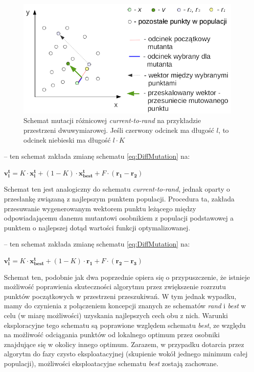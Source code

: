 \documentclass[12pt,a4paper]{report}
\begin{document}
{{{{\begin{description}
\begin{figure}[h]
\begin{center}\includegraphics[scale=0.8]{img/current-to-rand-mutation.png}\end{center}
\caption{Schemat mutacji różnicowej \emph{current-to-rand} na przykładzie przestrzeni dwuwymiarowej. Jeśli czerwony odcinek ma długość $l$, to odcinek niebieski ma długość $l \cdot K$}
\label{current-to-rand-img}
\end{figure}


\item[current-to-best] \cite{PracticalInsights} -- ten schemat zakłada zmianę schematu \ref{eq:DiffMutation} na:
\begin{center}
 $\mathbf{v_i^{t}} = K \cdot \mathbf{x_i^t} + (1 - K) \cdot \mathbf{x_{best}^t} + F \cdot (\mathbf{r_{1}} - \mathbf{r_{2}})$
\end{center}
Schemat ten jest analogiczny do schematu \emph{current-to-rand}, jednak oparty o przesłankę związaną z najlepszym punktem populacji. Procedura ta, zakłada przesuwanie wygenerowanym wektorem punktu leżącego między odpowiadającemu danemu mutantowi osobnikiem z populacji podstawowej a punktem o najlepszej dotąd wartości funkcji optymalizowanej.


\item[rand-to-best] \cite{PracticalInsights} -- ten schemat zakłada zmianę schematu \ref{eq:DiffMutation} na:
\begin{center}
 $\mathbf{v_i^{t}} = K \cdot \mathbf{x_{best}^t} + (1 - K) \cdot \mathbf{r_1} + F \cdot (\mathbf{r_{2}} - \mathbf{r_{3}})$
\end{center}
Schemat ten, podobnie jak dwa poprzednie opiera się o przypuszczenie, że istnieje możliwość poprawienia skuteczności algorytmu przez zwiększenie rozrzutu punktów początkowych w przestrzeni przeszukiwań. W tym jednak wypadku, mamy do czynienia z połączeniem koncepcji znanych ze schematów \emph{rand} i \emph{best} w celu (w miarę możliwości) uzyskania najlepszych cech obu z nich. Warunki eksploracyjne tego schematu są poprawione względem schematu \emph{best}, ze względu na możliwość odciągania punktów od lokalnego optimum przez osobniki znajdujące się w okolicy innego optimum. Zarazem, w przypadku dotarcia przez algorytm do fazy czysto eksploatacyjnej (skupienie wokół jednego minimum całej populacji), możliwości eksploatacyjne schematu \emph{best} zostają zachowane.


\end{description}}}}}
\end{document}
